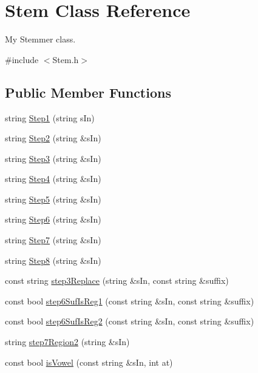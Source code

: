 \hypertarget{class_stem}{}\section{Stem Class Reference}
\label{class_stem}


My Stemmer class.  




{\ttfamily \#include $<$Stem.\+h$>$}

\subsection*{Public Member Functions}
\begin{DoxyCompactItemize}
\item 
string \hyperlink{class_stem_af3092c54c7551ab083c335d7dbb94c86}{Step1} (string s\+In)
\item 
string \hyperlink{class_stem_adadb6c35d5d8de25bfd4c39c13d47a8d}{Step2} (string \&s\+In)
\item 
string \hyperlink{class_stem_ae1e82f3cf3753cad9d99ada7f25d7697}{Step3} (string \&s\+In)
\item 
string \hyperlink{class_stem_a5d10addfe4f64dd68ac05227ae302977}{Step4} (string \&s\+In)
\item 
string \hyperlink{class_stem_af58972e6f9b64d6ca8fa18a6db13a5a6}{Step5} (string \&s\+In)
\item 
string \hyperlink{class_stem_a32d6b1690a87ce0f3f768e2be07bdcb5}{Step6} (string \&s\+In)
\item 
string \hyperlink{class_stem_a02934d9655b34dd4fb7d702359d01f32}{Step7} (string \&s\+In)
\item 
string \hyperlink{class_stem_a01a72f854d2b3846153560b2edd9d71f}{Step8} (string \&s\+In)
\item 
const string \hyperlink{class_stem_a92e01a887a1cdf6cba833639e3fe0bc7}{step3\+Replace} (string \&s\+In, const string \&suffix)
\item 
const bool \hyperlink{class_stem_a2a6706d496bb435848a5b585cd53503e}{step6\+Suf\+Is\+Reg1} (const string \&s\+In, const string \&suffix)
\item 
const bool \hyperlink{class_stem_adc4753b96d823602c46699613196cd28}{step6\+Suf\+Is\+Reg2} (const string \&s\+In, const string \&suffix)
\item 
string \hyperlink{class_stem_a1833c97aaa729ef6e21ee9d53972bec2}{step7\+Region2} (string \&s\+In)
\item 
const bool \hyperlink{class_stem_acbe5708482ee52612b29bcc6872cc7cf}{is\+Vowel} (const string \&s\+In, int at)

\end{DoxyCompactItemize}
